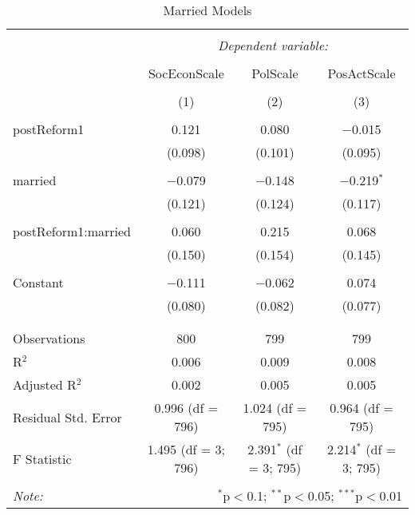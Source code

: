 
\begin{table}[!htbp] \centering 
  \caption{Married Models} 
  \label{} 
\begin{tabular}{@{\extracolsep{5pt}}lccc} 
\\[-1.8ex]\hline 
\hline \\[-1.8ex] 
 & \multicolumn{3}{c}{\textit{Dependent variable:}} \\ 
\cline{2-4} 
\\[-1.8ex] & SocEconScale & PolScale & PosActScale \\ 
\\[-1.8ex] & (1) & (2) & (3)\\ 
\hline \\[-1.8ex] 
 postReform1 & 0.121 & 0.080 & $-$0.015 \\ 
  & (0.098) & (0.101) & (0.095) \\ 
  & & & \\ 
 married & $-$0.079 & $-$0.148 & $-$0.219$^{*}$ \\ 
  & (0.121) & (0.124) & (0.117) \\ 
  & & & \\ 
 postReform1:married & 0.060 & 0.215 & 0.068 \\ 
  & (0.150) & (0.154) & (0.145) \\ 
  & & & \\ 
 Constant & $-$0.111 & $-$0.062 & 0.074 \\ 
  & (0.080) & (0.082) & (0.077) \\ 
  & & & \\ 
\hline \\[-1.8ex] 
Observations & 800 & 799 & 799 \\ 
R$^{2}$ & 0.006 & 0.009 & 0.008 \\ 
Adjusted R$^{2}$ & 0.002 & 0.005 & 0.005 \\ 
Residual Std. Error & 0.996 (df = 796) & 1.024 (df = 795) & 0.964 (df = 795) \\ 
F Statistic & 1.495 (df = 3; 796) & 2.391$^{*}$ (df = 3; 795) & 2.214$^{*}$ (df = 3; 795) \\ 
\hline 
\hline \\[-1.8ex] 
\textit{Note:}  & \multicolumn{3}{r}{$^{*}$p$<$0.1; $^{**}$p$<$0.05; $^{***}$p$<$0.01} \\ 
\end{tabular} 
\end{table} 
